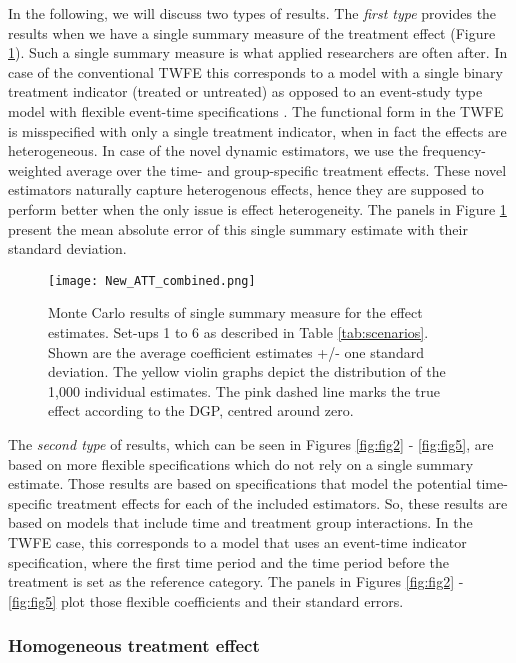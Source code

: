 In the following, we will discuss two types of results. The \emph{first type} provides the results when we have a single summary measure of the treatment effect (Figure \ref{fig:fig_att}). Such a single summary measure is what applied researchers are often after. In case of the conventional TWFE this corresponds to a model with a single binary treatment indicator (treated or untreated)
as opposed to an event-study type model with flexible event-time specifications \cite{Ludwig.2021}. The functional form in the TWFE is misspecified with only a single treatment indicator, when in fact the effects are heterogeneous. In case of the novel dynamic estimators, we use the frequency-weighted average over the time- and group-specific treatment effects. These novel estimators naturally capture heterogenous effects, hence they are supposed to perform better when the only issue is effect heterogeneity. The panels in Figure \ref{fig:fig_att} present the mean absolute error of this single summary estimate with their standard deviation. 

\begin{figure}[t]    \centering
    \texttt{[image: New\_ATT\_combined.png]}
    \caption{Monte Carlo results of single summary measure for the effect estimates. Set-ups 1 to 6 as described in Table \ref{tab:scenarios}. Shown are the average coefficient estimates +/- one standard deviation. The yellow violin graphs depict the distribution of the 1,000 individual estimates. The pink dashed line marks the true effect according to the DGP, centred around zero.}    \label{fig:fig_att}    \hypertarget{fig:fig_att}{}\end{figure}

The \emph{second type} of results, which can be seen in Figures \ref{fig:fig2} - \ref{fig:fig5}, are based on more flexible specifications which do not rely on a single summary estimate. Those results are based on specifications that model the potential time-specific treatment effects for each of the included estimators. So, these results are based on models that include time and treatment group interactions. In the TWFE case, this corresponds to a model that uses an event-time indicator specification, where the first time period and the time period before the treatment is set as the reference category. The panels in Figures \ref{fig:fig2} - \ref{fig:fig5} plot those flexible coefficients and their standard errors.

\subsubsection{Homogeneous treatment effect}

